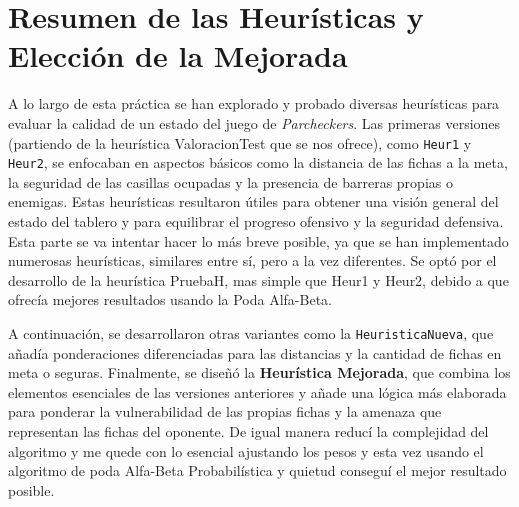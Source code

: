 \vspace{1em}

\chapter*{Resumen de las Heurísticas y Elección de la Mejorada}

A lo largo de esta práctica se han explorado y probado diversas heurísticas para evaluar la calidad de un estado del juego de \emph{Parcheckers}. Las primeras versiones (partiendo de la heurística ValoracionTest que se nos ofrece), como \texttt{Heur1} y \texttt{Heur2}, se enfocaban en aspectos básicos como la distancia de las fichas a la meta, la seguridad de las casillas ocupadas y la presencia de barreras propias o enemigas. Estas heurísticas resultaron útiles para obtener una visión general del estado del tablero y para equilibrar el progreso ofensivo y la seguridad defensiva. Esta parte se va intentar hacer lo más breve posible, ya que se han implementado numerosas heurísticas, similares entre sí, pero a la vez diferentes. Se optó por el desarrollo de la heurística PruebaH, mas simple que Heur1 y Heur2, debido a que ofrecía mejores resultados usando la Poda Alfa-Beta.

A continuación, se desarrollaron otras variantes como la \texttt{HeuristicaNueva}, que añadía ponderaciones diferenciadas para las distancias y la cantidad de fichas en meta o seguras. Finalmente, se diseñó la \textbf{Heurística Mejorada}, que combina los elementos esenciales de las versiones anteriores y añade una lógica más elaborada para ponderar la vulnerabilidad de las propias fichas y la amenaza que representan las fichas del oponente. De igual manera reducí la complejidad del algoritmo y me quede con lo esencial ajustando los pesos y esta vez usando el algoritmo de poda Alfa-Beta Probabilística y quietud conseguí el mejor resultado posible. 


